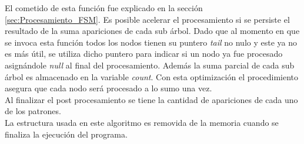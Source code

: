 El cometido de esta función fue explicado en la sección \ref{sec:Procesamiento_FSM}. Es posible acelerar el procesamiento si se persiste el resultado de la suma apariciones de cada sub árbol. Dado que al momento en que se invoca esta función todos los nodos tienen su puntero {\it tail} no nulo y este ya no es más útil, se utiliza dicho puntero para indicar si un nodo ya fue procesado asignándole {\it null} al final del procesamiento. Además la suma parcial de cada sub árbol es almacenado en la variable {\it count}. Con esta optimización el procedimiento asegura que cada nodo será procesado a lo sumo una vez.\\
Al finalizar el post procesamiento se tiene la cantidad de apariciones de cada uno de los patrones.\\
La estructura usada en este algoritmo es removida de la memoria cuando se finaliza la ejecución del programa.
